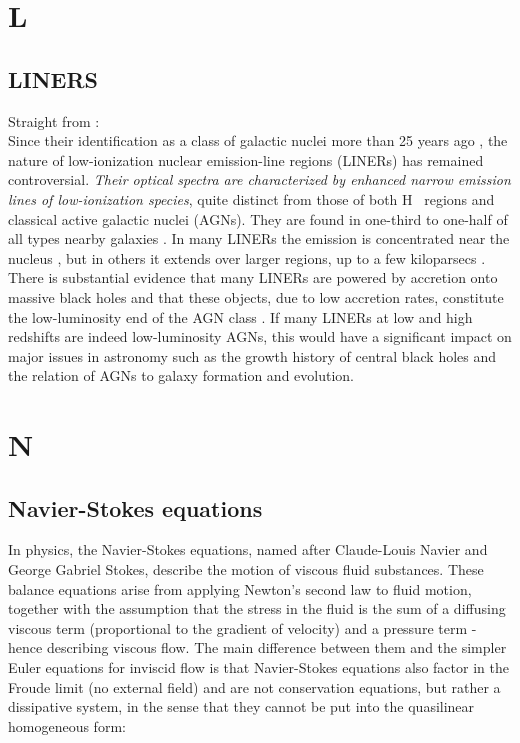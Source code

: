 \documentclass[11pt]{article}
\begin{document}
\section*{L}
\subsection*{LINERS}
Straight from \citet{Sturm2006}:\\
Since their identification as a class of galactic nuclei more than 25
years ago \citep{Heckman1980}, the nature of low-ionization nuclear
emission-line regions (LINERs) has remained controversial. {\it Their
optical spectra are characterized by enhanced narrow emission lines of
low-ionization species}, quite distinct from those of both {H~}
regions and classical active galactic nuclei (AGNs). They are found in
one-third to one-half of all types nearby galaxies
\citep[e.g.,][]{Ho1997}. In many LINERs the emission is concentrated
near the nucleus \citep[a few times 100 pc; e.g, ][]{Pogge2000}, but
in others it extends over larger regions, up to a few kiloparsecs
\cite{Veilleux1995}.  There is substantial evidence that many LINERs
are powered by accretion onto massive black holes and that these
objects, due to low accretion rates, constitute the low-luminosity end
of the AGN class \citep[][]{Quataert2001, Kewley2006}. If many LINERs
at low and high redshifts are indeed low-luminosity AGNs, this would
have a significant impact on major issues in astronomy such as the
growth history of central black holes and the relation of AGNs to
galaxy formation and evolution.


\section*{N}
\subsection*{Navier-Stokes equations}
In physics, the Navier-Stokes equations, named after Claude-Louis Navier and George Gabriel Stokes, describe the motion of viscous fluid substances. These balance equations arise from applying Newton's second law to fluid motion, together with the assumption that the stress in the fluid is the sum of a diffusing viscous term (proportional to the gradient of velocity) and a pressure term - hence describing viscous flow. The main difference between them and the simpler Euler equations for inviscid flow is that Navier-Stokes equations also factor in the Froude limit (no external field) and are not conservation equations, but rather a dissipative system, in the sense that they cannot be put into the quasilinear homogeneous form:
\end{document}
